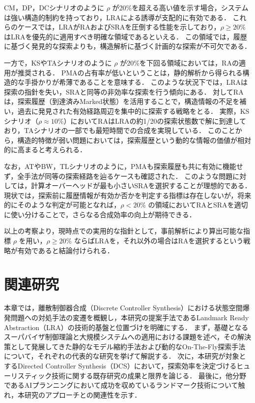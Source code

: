\documentclass[a4paper,11pt,oneside,openany,report,dvipdfmx]{jsbook}
\begin{document}
CM，DP，DCシナリオのように $\rho$ が20\%を超える高い値を示す場合，システムは強い構造的制約を持っており，LRAによる誘導が支配的に有効である．
これらのケースでは，LRAがRAおよびSRAを圧倒する性能を示しており，$\rho \geq 20\%$ はLRAを優先的に適用すべき明確な領域であるといえる．
この領域では，履歴に基づく発見的な探索よりも，構造解析に基づく計画的な探索が不可欠である．

一方で，KSやTAシナリオのように $\rho$ が20\%を下回る領域においては，RAの適用が推奨される．
PMAの占有率が低いということは，静的解析から得られる構造的な手掛かりが希薄であることを意味する．
このような状況下では，LRAは探索の指針を失い，SRAと同等の非効率な探索を行う傾向にある．
対してRAは，探索履歴（到達済みMarked状態）を活用することで，構造情報の不足を補い，過去に発見された有効経路周辺を集中的に探索する戦略をとる．
実際，KSシナリオ（$\rho \approx 10\%$）においてRAはLRAの約1/20の探索状態数で解に到達しており，TAシナリオの一部でも最短時間での合成を実現している．
このことから，構造的特徴が弱い問題においては，探索履歴という動的な情報の価値が相対的に高まると考えられる．

なお，ATやBW，TLシナリオのように，PMAも探索履歴も共に有効に機能せず，全手法が同等の探索経路を辿るケースも確認された．
このような問題に対しては，計算オーバーヘッドが最も小さいSRAを選択することが理想的である．
現状では，探索前に履歴情報が有効か否かを判定する指標は存在しないが，将来的にそのような判定が可能となれば，$\rho < 20\%$ の領域においてRAとSRAを適切に使い分けることで，さらなる合成効率の向上が期待できる．

以上の考察より，現時点での実用的な指針として，事前解析により算出可能な指標 $\rho$ を用い，$\rho \geq 20\%$ ならばLRAを，それ以外の場合はRAを選択するという戦略が有効であると結論付けられる．

\chapter{関連研究}
\label{chap:related_works}

本章では，離散制御器合成（Discrete Controller Synthesis）における状態空間爆発問題への対処手法の変遷を概観し，本研究の提案手法であるLandmark Ready Abstraction（LRA）の技術的基盤と位置づけを明確にする．
まず，基礎となるスーパバイザ制御理論と大規模システムへの適用における課題を述べ，その解決策として発展してきた静的なモデル縮約手法および動的なOn-The-Fly探索手法について，それぞれの代表的な研究を挙げて解説する．
次に，本研究が対象とするDirected Controller Synthesis（DCS）において，探索効率を決定づけるヒューリスティック技術に関する既存研究の成果と限界を論じる．
最後に，他分野であるAIプランニングにおいて成功を収めているランドマーク技術について触れ，本研究のアプローチとの関連性を示す．
\end{document}
